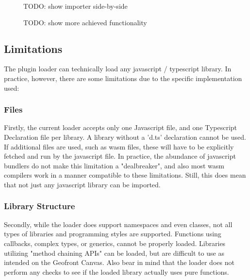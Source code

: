 \begin{figure}
  \centering
  \graphicspath{ {../../assets/diagrams/} }
  \caption[]{TODO: show importer side-by-side}
  \label{fig:todo-1}
\end{figure}


\begin{figure}
  \centering
  \graphicspath{ {../../assets/diagrams/} }
  \caption[]{TODO: show more achieved functionality}
  \label{fig:todo-2}
\end{figure}

\subsection{Limitations}
\label{sec:implementation:loading:limits}

The plugin loader can technically load any javascript / typescript library. 
In practice, however, there are some limitations due to the specific implementation used:

\subsubsection*{Files}
Firstly, the current loader accepts only one Javascript file, and one Typescript Declaration file per library.
A library without a 'd.ts' declaration cannot be used. 
If additional files are used, such as \ac{wasm} files, these will have to be explicitly fetched and run by the javascript file. 
In practice, the abundance of javascript bundlers do not make this limitation a "dealbreaker", and also most \ac{wasm} compilers work in a manner compatible to these limitations.
Still, this does mean that not just any javascript library can be imported. 

\subsubsection*{Library Structure}
Secondly, while the loader does support namespaces and even classes, not all types of libraries and programming styles are supported. 
Functions using callbacks, complex types, or generics, cannot be properly loaded. 
Libraries utilizing "method chaining APIs" can be loaded, but are difficult to use as intended on the Geofront Canvas.
Also bear in mind that the loader does not perform any checks to see if the loaded library actually uses pure functions. 

